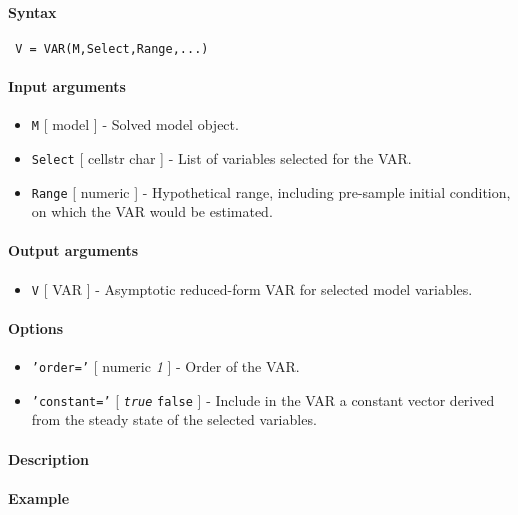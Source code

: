 


	\paragraph{Syntax}
 
 \begin{verbatim}
 V = VAR(M,Select,Range,...)
 \end{verbatim}
 
 \paragraph{Input arguments}
 
 \begin{itemize}
 \item
   \texttt{M} {[} model {]} - Solved model object.
 \item
   \texttt{Select} {[} cellstr \textbar{} char {]} - List of variables
   selected for the VAR.
 \item
   \texttt{Range} {[} numeric {]} - Hypothetical range, including
   pre-sample initial condition, on which the VAR would be estimated.
 \end{itemize}
 
 \paragraph{Output arguments}
 
 \begin{itemize}
 \item
   \texttt{V} {[} VAR {]} - Asymptotic reduced-form VAR for selected
   model variables.
 \end{itemize}
 
 \paragraph{Options}
 
 \begin{itemize}
 \item
   \texttt{'order='} {[} numeric \textbar{} \emph{1} {]} - Order of the
   VAR.
 \item
   \texttt{'constant='} {[} \emph{\texttt{true}} \textbar{}
   \texttt{false} {]} - Include in the VAR a constant vector derived from
   the steady state of the selected variables.
 \end{itemize}
 
 \paragraph{Description}
 
 \paragraph{Example}


